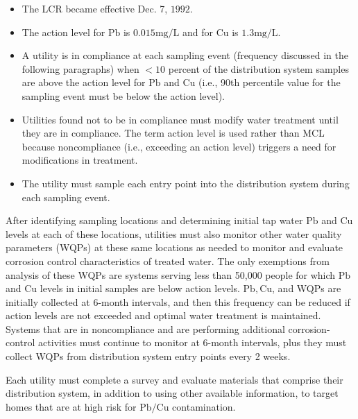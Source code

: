 \documentclass[10pt]{article}
\begin{document}
\begin{itemize}
  \item The LCR became effective Dec. 7, $1992 .$

  \item The action level for $\mathrm{Pb}$ is $0.015 \mathrm{mg} / \mathrm{L}$ and for $\mathrm{Cu}$ is $1.3 \mathrm{mg} / \mathrm{L}$.

  \item A utility is in compliance at each sampling event (frequency discussed in the following paragraphs) when $<10$ percent of the distribution system samples are above the action level for $\mathrm{Pb}$ and $\mathrm{Cu}$ (i.e., 90th percentile value for the sampling event must be below the action level).

  \item Utilities found not to be in compliance must modify water treatment until they are in compliance. The term action level is used rather than MCL because noncompliance (i.e., exceeding an action level) triggers a need for modifications in treatment.

  \item The utility must sample each entry point into the distribution system during each sampling event.

\end{itemize}
After identifying sampling locations and determining initial tap water $\mathrm{Pb}$ and $\mathrm{Cu}$ levels at each of these locations, utilities must also monitor other water quality parameters (WQPs) at these same locations as needed to monitor and evaluate corrosion control characteristics of treated water. The only exemptions from analysis of these WQPs are systems serving less than 50,000 people for which $\mathrm{Pb}$ and $\mathrm{Cu}$ levels in initial samples are below action levels. $\mathrm{Pb}, \mathrm{Cu}$, and WQPs are initially collected at 6-month intervals, and then this frequency can be reduced if action levels are not exceeded and optimal water treatment is maintained. Systems that are in noncompliance and are performing additional corrosion-control activities must continue to monitor at 6-month intervals, plus they must collect WQPs from distribution system entry points every 2 weeks.

Each utility must complete a survey and evaluate materials that comprise their distribution system, in addition to using other available information, to target homes that are at high risk for $\mathrm{Pb} / \mathrm{Cu}$ contamination.
\end{document}
